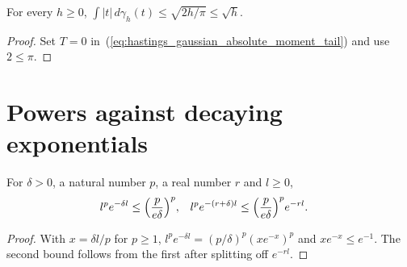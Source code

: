 \begin{lemma}
    \label{thm:hastings_gaussian_absolute_moment}
    \leanok
    For every $h\ge0$,
    $\int|t|\,d\gamma_h(t)\le\sqrt{2h/\pi}\le\sqrt h$.
\end{lemma}
\begin{proof}\leanok
    Set $T=0$ in~(\ref{eq:hastings_gaussian_absolute_moment_tail}) and use
    $2\le\pi$.
\end{proof}


\section{Powers against decaying exponentials}
\label{sec:gaussian_filtered_decay_slack}

\begin{lemma}
    \label{thm:hastings_pow_exp}
    \leanok
    For $\delta>0$, a natural number $p$, a real number $r$ and $l\ge0$,
    \begin{align}
        l^pe^{-\delta l}    & \le\Bigl(\frac{p}{e\delta}\Bigr)^p,        &
        l^pe^{-(r+\delta)l} & \le\Bigl(\frac{p}{e\delta}\Bigr)^pe^{-rl}.
        \label{eq:hastings_pow_exp}
    \end{align}
\end{lemma}
\begin{proof}\leanok
    With $x=\delta l/p$ for $p\ge1$, $l^pe^{-\delta l}=(p/\delta)^p(xe^{-x})^p$ and
    $xe^{-x}\le e^{-1}$. The second bound follows from the first after
    splitting off $e^{-rl}$.
\end{proof}
